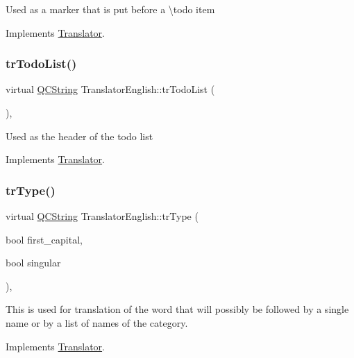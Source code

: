 Used as a marker that is put before a \textbackslash{}todo item 

Implements \mbox{\hyperlink{class_translator}{Translator}}.

\mbox{\label{class_translator_english_a71d78a4963cfe77a47c0402c2949c20e}} 
\subsubsection{\texorpdfstring{trTodoList()}{trTodoList()}}
{\footnotesize\ttfamily virtual \mbox{\hyperlink{class_q_c_string}{Q\+C\+String}} Translator\+English\+::tr\+Todo\+List (\begin{DoxyParamCaption}{ }\end{DoxyParamCaption})\hspace{0.3cm}{\ttfamily [inline]}, {\ttfamily [virtual]}}

Used as the header of the todo list 

Implements \mbox{\hyperlink{class_translator}{Translator}}.

\mbox{\label{class_translator_english_af6506400ea82fc2ef61938349b1bacd9}} 
\subsubsection{\texorpdfstring{trType()}{trType()}}
{\footnotesize\ttfamily virtual \mbox{\hyperlink{class_q_c_string}{Q\+C\+String}} Translator\+English\+::tr\+Type (\begin{DoxyParamCaption}\item[{bool}]{first\+\_\+capital,  }\item[{bool}]{singular }\end{DoxyParamCaption})\hspace{0.3cm}{\ttfamily [inline]}, {\ttfamily [virtual]}}

This is used for translation of the word that will possibly be followed by a single name or by a list of names of the category. 

Implements \mbox{\hyperlink{class_translator}{Translator}}.

\mbox{\label{class_translator_english_a1d471e5b119afcc1bf68f1b598d96041}} 
